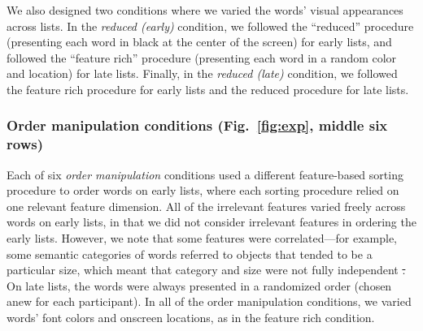 \documentclass[11pt]{article}
\newcommand{\featureCorrs}{S9} %
\providecommand{\DIFaddtex}[1]{{\protect\color{blue}\uwave{#1}}} %
\providecommand{\DIFdeltex}[1]{{\protect\color{red}\sout{#1}}}                      %
\providecommand{\DIFaddbegin}{} %
\providecommand{\DIFaddend}{} %
\providecommand{\DIFdelbegin}{} %
\providecommand{\DIFdelend}{} %
\providecommand{\DIFadd}[1]{\texorpdfstring{\DIFaddtex{#1}}{#1}} %
\providecommand{\DIFdel}[1]{\texorpdfstring{\DIFdeltex{#1}}{}} %
\newcommand{\DIFscaledelfig}{0.5}
\newlength{\DIFdelgraphicswidth} %
\newlength{\DIFdelgraphicsheight} %
\newcommand{\DIFaddincludegraphics}[2][]{{\color{blue}\fbox{\DIFOincludegraphics[#1]{#2}}}} %
\newcommand{\DIFdelincludegraphics}[2][]{%
\sbox{\DIFdelgraphicsbox}{\DIFOincludegraphics[#1]{#2}}%
\settoboxwidth{\DIFdelgraphicswidth}{\DIFdelgraphicsbox} %
\settoboxtotalheight{\DIFdelgraphicsheight}{\DIFdelgraphicsbox} %
\scalebox{\DIFscaledelfig}{%
\parbox[b]{\DIFdelgraphicswidth}{\usebox{\DIFdelgraphicsbox}\\[-\baselineskip] \rule{\DIFdelgraphicswidth}{0em}}\llap{\resizebox{\DIFdelgraphicswidth}{\DIFdelgraphicsheight}{%
\setlength{\unitlength}{\DIFdelgraphicswidth}%
\begin{picture}(1,1)%
\thicklines\linethickness{2pt} %
{\color[rgb]{1,0,0}\put(0,0){\framebox(1,1){}}}%
{\color[rgb]{1,0,0}\put(0,0){\line( 1,1){1}}}%
{\color[rgb]{1,0,0}\put(0,1){\line(1,-1){1}}}%
\end{picture}%
}\hspace*{3pt}}} %
} %
\DeclareRobustCommand{\DIFaddbegin}{\DIFOaddbegin \let\includegraphics\DIFaddincludegraphics} %
\DeclareRobustCommand{\DIFaddend}{\DIFOaddend \let\includegraphics\DIFOincludegraphics} %
\DeclareRobustCommand{\DIFdelbegin}{\DIFOdelbegin \let\includegraphics\DIFdelincludegraphics} %
\DeclareRobustCommand{\DIFdelend}{\DIFOaddend \let\includegraphics\DIFOincludegraphics} %
\begin{document}
We also designed two conditions where we varied the words' visual appearances
across lists. In the \textit{reduced (early)} condition, we followed the
``reduced'' procedure (presenting each word in black at the center of the
screen) for early lists, and followed the ``feature rich'' procedure
(presenting each word in a random color and location) for late lists. Finally,
in the \textit{reduced (late)} condition, we followed the feature rich
procedure for early lists and the reduced procedure for late lists.

\subsubsection*{Order manipulation conditions (Fig.~\ref{fig:exp}, middle six
rows)}

Each of six \textit{order manipulation} conditions used a different
feature-based sorting procedure to order words on early lists, where each
sorting procedure relied on one relevant feature dimension. All of the
irrelevant features varied freely across words on early lists, in that we did
not consider irrelevant features in ordering the early lists. However, we note
that some features were correlated---for example, some semantic categories of
words referred to objects that tended to be a particular size, which meant that
category and size were not fully independent \DIFdelbegin \DIFdel{. }\DIFdelend \DIFaddbegin \DIFadd{(Fig.~\featureCorrs). }\DIFaddend On late
lists, the words were always presented in a randomized order (chosen anew for
each participant). In all of the order manipulation conditions, we varied
words' font colors and onscreen locations, as in the feature rich condition.
\end{document}

